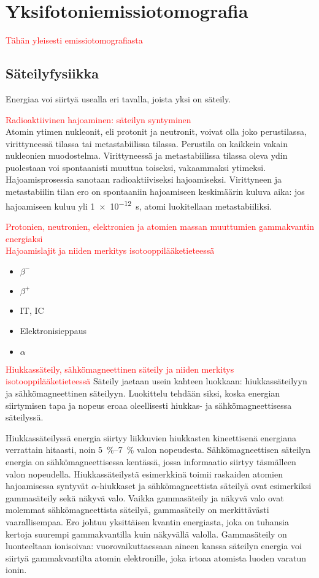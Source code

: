 \section{Yksifotoniemissiotomografia}
\textcolor{red}{Tähän yleisesti emissiotomografiasta}
\subsection{Säteilyfysiikka}
Energiaa voi siirtyä usealla eri tavalla, joista yksi on säteily.

\textcolor{red}{Radioaktiivinen hajoaminen: säteilyn syntyminen}\\
Atomin ytimen nukleonit, eli protonit ja neutronit, voivat olla joko perustilassa, virittyneessä tilassa tai metastabiilissa tilassa\cite{cherry_basic_2012}. Perustila on kaikkein vakain nukleonien muodostelma. Virittyneessä ja metastabiilissa tilassa oleva ydin puolestaan voi spontaanisti muuttua toiseksi, vakaammaksi ytimeksi. Hajoamisprosessia sanotaan radioaktiiviseksi hajoamiseksi.\cite{cherry_modes_2012} Virittyneen ja metastabiilin tilan ero on spontaaniin hajoamiseen keskimäärin kuluva aika: jos hajoamiseen kuluu yli \qty{1e-12}{\second}, atomi luokitellaan metastabiiliksi\cite{cherry_basic_2012}.

\textcolor{red}{Protonien, neutronien, elektronien ja atomien massan muuttumien gammakvantin energiaksi}\\
\textcolor{red}{Hajoamislajit ja niiden merkitys isotooppilääketieteessä}
\begin{itemize}
    \item $\beta^{-}$
    \item $\beta^{+}$
    \item IT, IC
    \item Elektronisieppaus
    \item $\alpha$
\end{itemize}

\textcolor{red}{Hiukkassäteily, sähkömagneettinen säteily ja niiden merkitys isotooppilääketieteessä}
Säteily jaetaan usein kahteen luokkaan: hiukkassäteilyyn ja sähkömagneettinen säteilyyn.\cite{cherry_basic_2012, cherry_interaction_2012} Luokittelu tehdään siksi, koska energian siirtymisen tapa ja nopeus eroaa oleellisesti hiukkas- ja sähkömagneettisessa säteilyssä.

Hiukkassäteilyssä energia siirtyy liikkuvien hiukkasten kineettisenä energiana verrattain hitaasti, noin \qtyrange{5}{7}{\percent} valon nopeudesta. Sähkömagneettisen säteilyn energia on sähkömagneettisessa kentässä, jossa informaatio siirtyy täsmälleen valon nopeudella.\cite{cherry_basic_2012} Hiukkassäteilystä esimerkkinä toimii raskaiden atomien hajoamisessa syntyvät $\alpha$-hiukkaset ja sähkömagneettista säteilyä ovat esimerkiksi gammasäteily sekä näkyvä valo. Vaikka gammasäteily ja näkyvä valo ovat molemmat sähkömagneettista säteilyä, gammasäteily on merkittävästi vaarallisempaa. Ero johtuu yksittäisen kvantin energiasta, joka on tuhansia kertoja suurempi gammakvantilla kuin näkyvällä valolla. Gammasäteily on luonteeltaan ionisoivaa: vuorovaikuttaessaan aineen kanssa säteilyn energia voi siirtyä gammakvantilta atomin elektronille, joka irtoaa atomista luoden varatun ionin\cite{cherry_interaction_2012}. 

